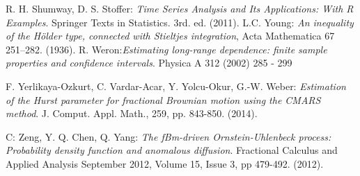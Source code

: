 \documentclass[12pt,reqno]{amsart}
\theoremstyle{definition}
\theoremstyle{remark}
\numberwithin{equation}{section}
\begin{document}
\begin{thebibliography}{99}
 R. H. Shumway, D. S. Stoffer: {\it Time Series Analysis and Its Applications: With R Examples}.
Springer Texts in Statistics. 3rd. ed. (2011).
  L.C. Young: {\it An inequality of the H\"older type, connected with Stieltjes integration}, Acta Mathematica 67
251–282. (1936).
 R. Weron:{\it Estimating long-range dependence: finite sample properties and confidence intervals}.
Physica A 312 (2002) 285 - 299

 F. Yerlikaya-Ozkurt, C. Vardar-Acar, Y. Yolcu-Okur, G.-W. Weber:
{\it Estimation of the Hurst parameter for fractional Brownian motion using the CMARS method}.
J. Comput. Appl. Math., 259, pp. 843-850.  (2014).

 C: Zeng, Y. Q. Chen, Q. Yang: {\it The fBm-driven Ornstein-Uhlenbeck process: Probability density function and
anomalous diffusion}. Fractional Calculus and Applied Analysis September 2012, Volume 15, Issue 3, pp 479-492. (2012).


\end{thebibliography}
\end{document}
